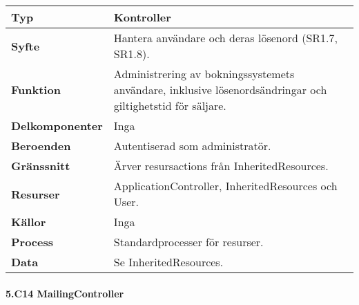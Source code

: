 \documentclass[a4paper, twoside, 11pt, titlepage]{article}
\begin{document}
			\begin {table} [ht] \begin{tabular} {  p{3.5cm} p{11.6cm} }
				\hline
				{\sffamily\textbf{Typ}} & {Kontroller} \\
				\hline
				{\sffamily\textbf{Syfte}} & {Hantera användare och deras lösenord (SR1.7, SR1.8).} \\
				\hline
				{\sffamily\textbf{Funktion}} & {Administrering av bokningssystemets användare, inklusive lösenordsändringar och giltighetstid för säljare.} \\
				\hline
				{\sffamily\textbf{Delkomponenter}} & {Inga} \\
				\hline
				{\sffamily\textbf{Beroenden}} & {Autentiserad som administratör.} \\
				\hline
				{\sffamily\textbf{Gränssnitt}} & {Ärver resursactions från InheritedResources.} \\
				\hline
				{\sffamily\textbf{Resurser}} & {ApplicationController, InheritedResources och User.} \\
				\hline
				{\sffamily\textbf{Källor}} & {Inga} \\
				\hline
				{\sffamily\textbf{Process}} & {Standardprocesser för resurser.} \\
				\hline
				{\sffamily\textbf{Data}} & {Se InheritedResources.} \\
				\hline
			\end{tabular} \end{table} \FloatBarrier


			\clearpage %
			\paragraph{5.C14 MailingController}\
\end{document}
